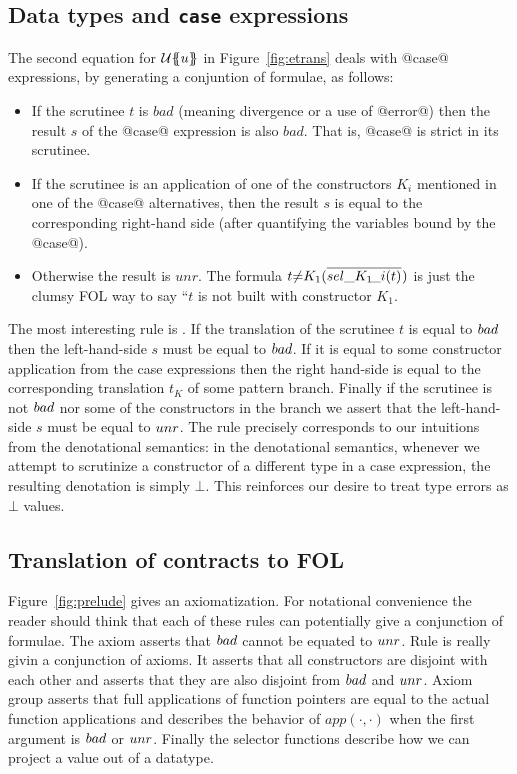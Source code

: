\subsection{Data types and {\tt case} expressions} \label{s:case-fol}

The second equation for ${\cal U}\{\!\!\{u\}\!\!\}{}$ in Figure~\ref{fig:etrans} deals with
@case@ expressions, by generating a conjuntion of formulae, as follows:
\begin{itemize}
\item If the scrutinee $t$ is $bad$ (meaning divergence or a use of @error@) then
the result $s$ of the @case@ expression is also $bad$.  That is, @case@ is strict in
its scrutinee.
\item If the scrutinee is an application of one of the constructors $K_i$ mentioned
in one of the @case@ alternatives, then the result $s$ is equal to the corresponding
right-hand side (after quantifying the variables bound by the @case@).
\item Otherwise the result is $unr$.  The formula 
  $t{\neq}K_1(\overline{{\mathop{sel\_K_1\!\_i}}(t)}^{})$ 
is just the clumsy FOL way to say ``$t$ is not built with constructor $K_1$.
\end{itemize}
The most interesting rule is . If the translation of the scrutinee
$t$ is equal to $\mathop{bad}$ then the left-hand-side $s$ must be equal to $\mathop{bad}$. If it is 
equal to some constructor application from the case expressions then the right 
hand-side is equal to the corresponding translation $t_K$ of some pattern branch. Finally
if the scrutinee is not $\mathop{bad}$ nor some of the constructors in the branch we assert that
the left-hand-side $s$ must be equal to $\mathop{unr}$. The rule precisely corresponds to our 
intuitions from the denotational semantics: in the denotational semantics, whenever
we attempt to scrutinize a constructor of a different type in a case expression, the 
resulting denotation is simply $\bot$. This reinforces our desire to treat type errors
as $\bot$ values. 

\subsection{Translation of contracts to FOL}

Figure~\ref{fig:prelude} gives an axiomatization. For notational convenience the reader
should think that each of these rules can potentially give a conjunction of formulae.
The axiom  asserts that $\mathop{bad}$ cannot be equated to $\mathop{unr}$. 
Rule  is really givin a conjunction of axioms. It asserts that all 
constructors are disjoint with each other and  asserts that they 
are also disjoint from $\mathop{bad}$ and $\mathop{unr}$. 
Axiom group  asserts that full applications of function pointers 
are equal to the actual function applications and  describes the behavior
of $app(\cdot,\cdot)$ when the first argument is $\mathop{bad}$ or $\mathop{unr}$. Finally the selector
functions describe how we can project a value out of a datatype. 


